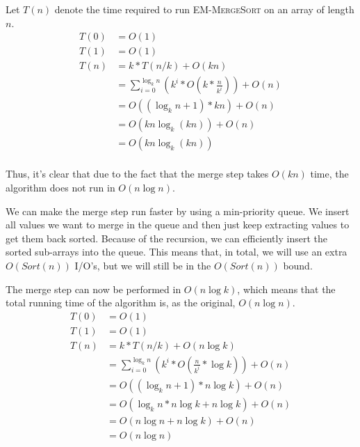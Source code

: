 Let $T(n)$ denote the time required to run \textsc{EM-MergeSort} on an array of length $n$.
\begin{equation}
\begin{split}
T(0) &= O(1)\\
T(1) &= O(1)\\
T(n) &= k * T(n/k) + O(k n)\\
&= \sum_{i = 0}^{\log_k{n}} (k^i * O(k * \frac{n}{k^i})) + O(n)\\
&= O((\log_k{n} + 1) *  k n)+ O(n)\\
&= O(k n \log_k{(k n)}) + O(n)\\
&= O(k n \log_k{(k n)})\\
\end{split}
\end{equation}

Thus, it's clear that due to the fact that the merge step takes $O(k n)$ time, the algorithm does not run in $O(n \log{n})$.

We can make the merge step run faster by using a min-priority queue.
We insert all values we want to merge in the queue and then just keep extracting values to get them back sorted.
Because of the recursion, we can efficiently insert the sorted sub-arrays into the queue.
This means that, in total, we will use an extra $O(Sort(n))$ I/O's, but we will still be in the $O(Sort(n))$ bound.

The merge step can now be performed in $O(n \log{k})$, which means that the total running time of the algorithm is, as the original, $O(n \log{n})$.
\begin{equation}
\begin{split}
T(0) &= O(1)\\
T(1) &= O(1)\\
T(n) &= k * T(n/k) + O(n \log{k})\\
&= \sum_{i = 0}^{\log_k{n}} (k^i * O(\frac{n}{k^i} * \log{k})) + O(n)\\
&= O((\log_k{n} + 1) * n \log{k})+ O(n)\\
&= O(\log_k{n} * n \log{k} + n \log{k}) + O(n)\\
&= O(n \log{n} + n \log{k}) + O(n)\\
&= O(n \log{n})
\end{split}
\end{equation}